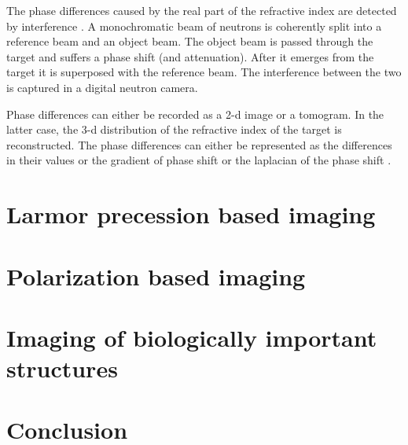 \documentclass{article}
\numberwithin{equation}{section}
\begin{document}
The phase differences caused by the real part of the refractive index are
detected by interference \cite{zawisky2004neutron}. A monochromatic beam of
neutrons is coherently split into a reference beam and an object beam. The 
object beam is passed through the target and suffers a phase shift (and 
attenuation). After it emerges from the target it is superposed with the 
reference beam. The interference between the two is captured in a digital
neutron camera.

Phase differences can either be recorded as a 2-d image or a tomogram. In the
latter case, the 3-d distribution of the refractive index of the target is 
reconstructed. The phase differences can either be represented as the 
differences in their values or the gradient of phase shift or the laplacian of
the phase shift \cite{anderson2008neutron}.

\section{Larmor precession based imaging}\label{s11}
\section{Polarization based imaging}\label{s12}
\section{Imaging of biologically important structures}\label{s13}
\section{Conclusion}\label{s14}


\end{document}
